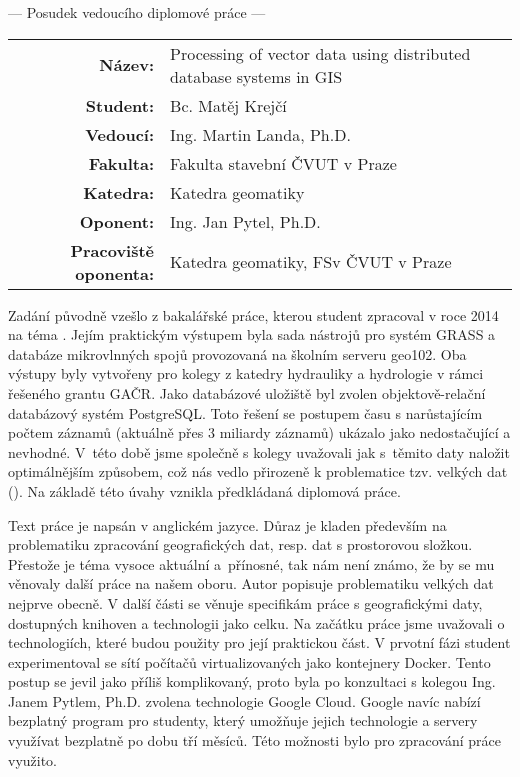 \documentclass[czech,11pt,a4paper]{article}
\begin{document}
\begin{center}
  {\Large --- Posudek vedoucího diplomové práce ---}
\end{center}

\vspace{.2cm}

\noindent \begin{tabular}{rp{}}
  {\bf Název:} & Processing of vector data using distributed database systems in GIS \\
  {\bf Student:} & Bc. Matěj Krejčí \\
  {\bf Vedoucí:} & Ing. Martin Landa, Ph.D. \\
  {\bf Fakulta:} & Fakulta stavební ČVUT v Praze \\ 
  {\bf Katedra:} & Katedra geomatiky \\
  {\bf Oponent:} & Ing. Jan Pytel, Ph.D. \\
  {\bf Pracoviště oponenta:} & Katedra geomatiky, FSv ČVUT v Praze \\
\end{tabular}

\vspace{1cm}

Zadání původně vzešlo z bakalářské práce, kterou student zpracoval v
roce 2014 na téma . Jejím praktickým
výstupem byla sada nástrojů pro systém GRASS a databáze mikrovlnných
spojů provozovaná na školním serveru geo102. Oba výstupy byly
vytvořeny  pro kolegy z katedry hydrauliky a hydrologie v
rámci řešeného grantu GAČR. Jako databázové uložiště byl zvolen
objektově-relační databázový systém PostgreSQL. Toto řešení se
postupem času s narůstajícím počtem záznamů (aktuálně přes 3 miliardy
záznamů) ukázalo jako nedostačující a nevhodné. V~této době jsme
společně s kolegy uvažovali jak s~těmito daty naložit optimálnějším
způsobem, což nás vedlo přirozeně k problematice tzv. velkých dat
(). Na základě této úvahy vznikla předkládaná diplomová
práce. \newline

Text práce je napsán v anglickém jazyce. Důraz je kladen především na
problematiku zpracování geografických dat, resp. dat s prostorovou
složkou. Přestože je téma vysoce aktuální a~přínosné, tak nám není
známo, že by se mu věnovaly další práce na našem oboru. Autor popisuje
problematiku velkých dat nejprve obecně. V další části se věnuje
specifikám práce s geografickými daty, dostupných knihoven a
technologii jako celku. Na začátku práce jsme uvažovali o
technologiích, které budou použity pro její praktickou část. V
prvotní fázi student experimentoval se sítí počítačů virtualizovaných
jako kontejnery Docker. Tento postup se jevil jako příliš
komplikovaný, proto byla po konzultaci s kolegou Ing. Janem Pytlem,
Ph.D. zvolena technologie Google Cloud. Google navíc nabízí bezplatný
program pro studenty, který umožňuje jejich technologie a servery
využívat bezplatně po dobu tří měsíců. Této možnosti bylo pro
zpracování práce využito. \newline
\end{document}
